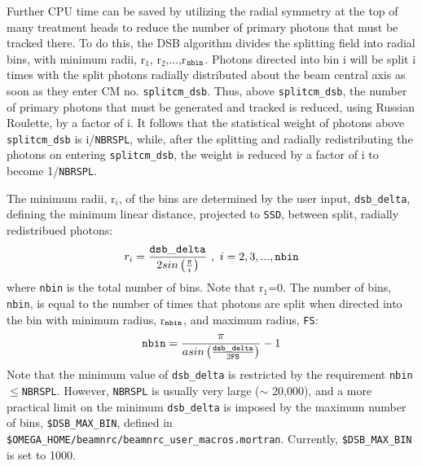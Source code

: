 \documentclass[12pt,twoside]{article}
\begin{document}
Further CPU time can be saved by utilizing the radial symmetry at the top of many treatment heads to reduce the
number of primary photons that must be tracked there.  To do this, the DSB algorithm divides the splitting field
into radial bins, with minimum radii, r$_1$, r$_2$,...,r$_{\tt nbin}$.
Photons directed into bin i will be split
i times with the split photons radially distributed about the beam central axis as soon as they enter
CM no. {\tt splitcm\_dsb}.  Thus, above {\tt splitcm\_dsb}, the number of primary photons that must be
generated and tracked is
reduced, using Russian Roulette, by a factor of i.  It follows that the statistical weight of photons above {\tt splitcm\_dsb} is i/{\tt NBRSPL}, while, after the splitting and radially redistributing the photons on entering {\tt splitcm\_dsb}, the weight is
reduced by a factor of i to become 1/{\tt NBRSPL}.

The minimum radii, r$_i$, of the bins are determined by the user input, {\tt dsb\_delta}, defining the minimum
linear distance, projected to {\tt SSD}, between split, radially redistribued photons:
\begin{equation}
r_i=\frac{\tt dsb\_delta}{2sin\left(\frac{\pi}{i}\right)}~,~ i=2,3,...,{\tt nbin}
\label{rieqn}
\end{equation}
where {\tt nbin} is the total number of bins.  Note that r$_1$=0.  The number of bins, {\tt nbin}, is equal
to the number of times that photons are split when directed into the bin with minimum radius, r$_{\tt nbin}$,
and maximum radius, {\tt FS}:
\begin{equation}
{\tt nbin}=\frac{\pi}{asin\left(\frac{\tt dsb\_delta}{2{\tt FS}}\right)}-1
\label{nbineqn}
\end{equation}
Note that the minimum value of {\tt dsb\_delta} is restricted by the requirement {\tt nbin}$\leq${\tt NBRSPL}.
However, {\tt NBRSPL} is usually very large ($\sim$ 20,000), and a more practical limit on the minimum
{\tt dsb\_delta} is imposed by the maximum number of bins, {\tt \$DSB\_MAX\_BIN}, defined in
{\tt \$OMEGA\_HOME/beamnrc/beamnrc\_user\_macros.mortran}.  Currently, {\tt \$DSB\_MAX\_BIN} is set to
1000.
\end{document}
